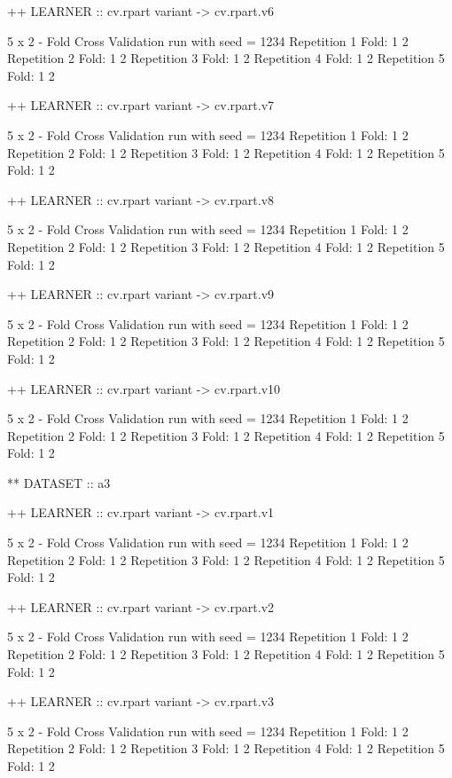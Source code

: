 \documentclass{article}
\begin{document}
\begin{Schunk}
\begin{Soutput}
++ LEARNER :: cv.rpart  variant ->  cv.rpart.v6 

 5 x 2 - Fold Cross Validation run with seed =  1234 
Repetition  1 
Fold:  1  2
Repetition  2 
Fold:  1  2
Repetition  3 
Fold:  1  2
Repetition  4 
Fold:  1  2
Repetition  5 
Fold:  1  2


++ LEARNER :: cv.rpart  variant ->  cv.rpart.v7 

 5 x 2 - Fold Cross Validation run with seed =  1234 
Repetition  1 
Fold:  1  2
Repetition  2 
Fold:  1  2
Repetition  3 
Fold:  1  2
Repetition  4 
Fold:  1  2
Repetition  5 
Fold:  1  2


++ LEARNER :: cv.rpart  variant ->  cv.rpart.v8 

 5 x 2 - Fold Cross Validation run with seed =  1234 
Repetition  1 
Fold:  1  2
Repetition  2 
Fold:  1  2
Repetition  3 
Fold:  1  2
Repetition  4 
Fold:  1  2
Repetition  5 
Fold:  1  2


++ LEARNER :: cv.rpart  variant ->  cv.rpart.v9 

 5 x 2 - Fold Cross Validation run with seed =  1234 
Repetition  1 
Fold:  1  2
Repetition  2 
Fold:  1  2
Repetition  3 
Fold:  1  2
Repetition  4 
Fold:  1  2
Repetition  5 
Fold:  1  2


++ LEARNER :: cv.rpart  variant ->  cv.rpart.v10 

 5 x 2 - Fold Cross Validation run with seed =  1234 
Repetition  1 
Fold:  1  2
Repetition  2 
Fold:  1  2
Repetition  3 
Fold:  1  2
Repetition  4 
Fold:  1  2
Repetition  5 
Fold:  1  2


** DATASET :: a3

++ LEARNER :: cv.rpart  variant ->  cv.rpart.v1 

 5 x 2 - Fold Cross Validation run with seed =  1234 
Repetition  1 
Fold:  1  2
Repetition  2 
Fold:  1  2
Repetition  3 
Fold:  1  2
Repetition  4 
Fold:  1  2
Repetition  5 
Fold:  1  2


++ LEARNER :: cv.rpart  variant ->  cv.rpart.v2 

 5 x 2 - Fold Cross Validation run with seed =  1234 
Repetition  1 
Fold:  1  2
Repetition  2 
Fold:  1  2
Repetition  3 
Fold:  1  2
Repetition  4 
Fold:  1  2
Repetition  5 
Fold:  1  2


++ LEARNER :: cv.rpart  variant ->  cv.rpart.v3 

 5 x 2 - Fold Cross Validation run with seed =  1234 
Repetition  1 
Fold:  1  2
Repetition  2 
Fold:  1  2
Repetition  3 
Fold:  1  2
Repetition  4 
Fold:  1  2
Repetition  5 
Fold:  1  2



\end{Soutput}
\end{Schunk}
\end{document}
